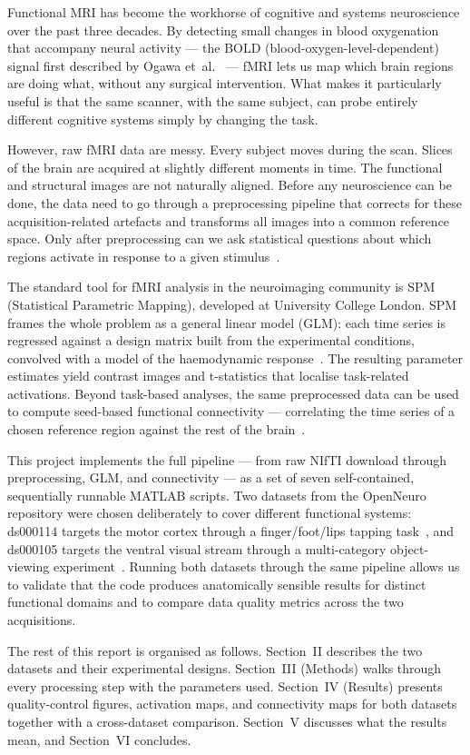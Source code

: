 Functional MRI has become the workhorse of cognitive and systems
neuroscience over the past three decades. By detecting small changes
in blood oxygenation that accompany neural activity — the BOLD
(blood-oxygen-level-dependent) signal first described by Ogawa
et~al.~\cite{Ogawa1990} — fMRI lets us map which brain regions are
doing what, without any surgical intervention. What makes it
particularly useful is that the same scanner, with the same subject,
can probe entirely different cognitive systems simply by changing the
task.

However, raw fMRI data are messy. Every subject moves during the
scan. Slices of the brain are acquired at slightly different moments
in time. The functional and structural images are not naturally
aligned. Before any neuroscience can be done, the data need to go
through a preprocessing pipeline that corrects for these
acquisition-related artefacts and transforms all images into a common
reference space. Only after preprocessing can we ask statistical
questions about which regions activate in response to a given
stimulus~\cite{Poldrack2011}.

The standard tool for fMRI analysis in the neuroimaging community is
SPM (Statistical Parametric Mapping), developed at University College
London. SPM frames the whole problem as a general linear model
(GLM): each time series is regressed against a design matrix built
from the experimental conditions, convolved with a model of the
haemodynamic response~\cite{Friston1994}. The resulting parameter
estimates yield contrast images and t-statistics that localise
task-related activations. Beyond task-based analyses, the same
preprocessed data can be used to compute seed-based functional
connectivity — correlating the time series of a chosen reference
region against the rest of the brain~\cite{Biswal1995}.

This project implements the full pipeline — from raw NIfTI download
through preprocessing, GLM, and connectivity — as a set of seven
self-contained, sequentially runnable MATLAB scripts. Two datasets
from the OpenNeuro repository were chosen deliberately to cover
different functional systems: ds000114 targets the motor cortex
through a finger/foot/lips tapping task~\cite{Gorgolewski2013}, and
ds000105 targets the ventral visual stream through a
multi-category object-viewing experiment~\cite{Haxby2001}. Running
both datasets through the same pipeline allows us to validate
that the code produces anatomically sensible results for distinct
functional domains and to compare data quality metrics across the
two acquisitions.

The rest of this report is organised as follows. Section~II describes
the two datasets and their experimental designs. Section~III
(Methods) walks through every processing step with the parameters
used. Section~IV (Results) presents quality-control figures,
activation maps, and connectivity maps for both datasets together
with a cross-dataset comparison. Section~V discusses what the results
mean, and Section~VI concludes.
